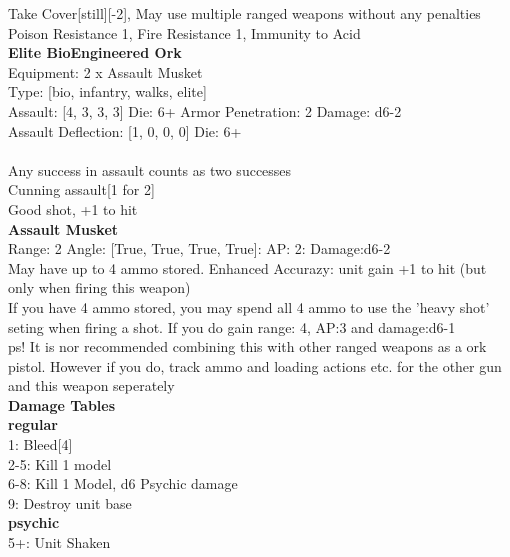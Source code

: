 Take Cover[still][-2], May use multiple ranged weapons without any penalties\\ 
Poison Resistance 1, Fire Resistance 1, Immunity to Acid\\ 


{\bf Elite BioEngineered Ork } \\
Equipment: 2 x Assault Musket \\
Type: [bio, infantry, walks, elite] \\

Assault: [4, 3, 3, 3] Die: 6+ Armor Penetration: 2 Damage: d6-2 \\
Assault Deflection: [1, 0, 0, 0] Die: 6+\\
\\
Any success in assault counts as two successes \\
Cunning assault[1 for 2]\\ 
 

Good shot, +1 to hit\\ 


{\bf Assault Musket } \\



Range: 2  Angle: [True, True, True, True]: AP: 2: Damage:d6-2 \\
May have up to 4 ammo stored. Enhanced Accurazy: unit gain +1 to hit (but only when firing this weapon)\\ 
If you have 4 ammo stored, you may spend all 4 ammo to use the 'heavy shot' seting when firing a shot. If you do gain range: 4, AP:3 and damage:d6-1\\ 
 ps! It is nor recommended combining this with other ranged weapons as a ork pistol. However if you do, track ammo and loading actions etc. for the other gun and this weapon seperately\\ 




 





{\bf Damage Tables} \\
 {\bf regular } \\
1: Bleed[4] \\
2-5: Kill 1 model \\
6-8: Kill 1 Model, d6 Psychic damage \\
9: Destroy unit base \\
 {\bf psychic } \\
5+: Unit Shaken \\










